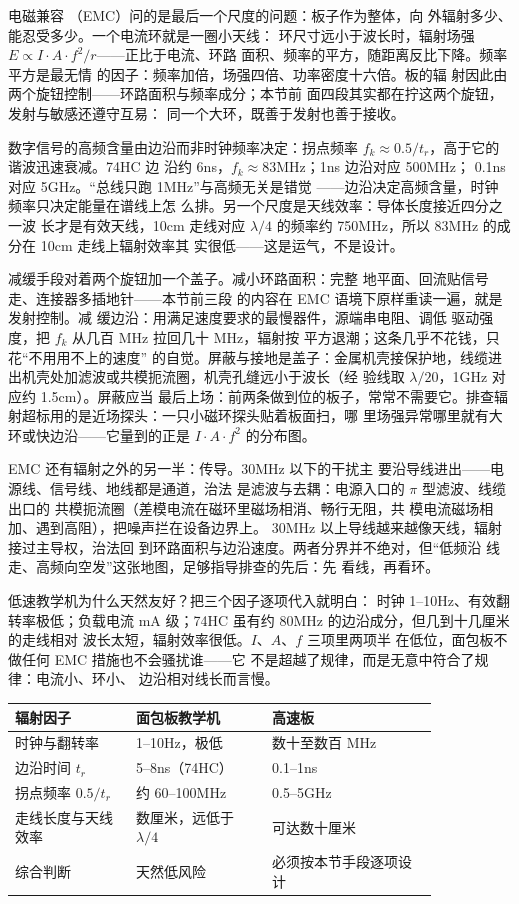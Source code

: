 电磁兼容
（EMC）问的是最后一个尺度的问题：板子作为整体，向
外辐射多少、能忍受多少。一个电流环就是一圈小天线：
环尺寸远小于波长时，辐射场强
$E\propto I\cdot A\cdot f^2/r$——正比于电流、环路
面积、频率的平方，随距离反比下降。频率平方是最无情
的因子：频率加倍，场强四倍、功率密度十六倍。板的辐
射因此由两个旋钮控制——环路面积与频率成分；本节前
面四段其实都在拧这两个旋钮，发射与敏感还遵守互易：
同一个大环，既善于发射也善于接收。

数字信号的高频含量由边沿而非时钟频率决定：拐点频率
$f_k\approx0.5/t_r$，高于它的谐波迅速衰减。74HC 边
沿约 6ns，$f_k\approx83$MHz；1ns 边沿对应 500MHz；
0.1ns 对应 5GHz。“总线只跑 1MHz”与高频无关是错觉
——边沿决定高频含量，时钟频率只决定能量在谱线上怎
么排。另一个尺度是天线效率：导体长度接近四分之一波
长才是有效天线，10cm 走线对应 $\lambda/4$ 的频率约
750MHz，所以 83MHz 的成分在 10cm 走线上辐射效率其
实很低——这是运气，不是设计。

减缓手段对着两个旋钮加一个盖子。减小环路面积：完整
地平面、回流贴信号走、连接器多插地针——本节前三段
的内容在 EMC 语境下原样重读一遍，就是发射控制。减
缓边沿：用满足速度要求的最慢器件，源端串电阻、调低
驱动强度，把 $f_k$ 从几百 MHz 拉回几十 MHz，辐射按
平方退潮；这条几乎不花钱，只花“不用用不上的速度”
的自觉。屏蔽与接地是盖子：金属机壳接保护地，线缆进
出机壳处加滤波或共模扼流圈，机壳孔缝远小于波长（经
验线取 $\lambda/20$，1GHz 对应约 1.5cm）。屏蔽应当
最后上场：前两条做到位的板子，常常不需要它。排查辐
射超标用的是近场探头：一只小磁环探头贴着板面扫，哪
里场强异常哪里就有大环或快边沿——它量到的正是
$I\cdot A\cdot f^2$ 的分布图。

EMC 还有辐射之外的另一半：传导。30MHz 以下的干扰主
要沿导线进出——电源线、信号线、地线都是通道，治法
是滤波与去耦：电源入口的 $\pi$ 型滤波、线缆出口的
共模扼流圈（差模电流在磁环里磁场相消、畅行无阻，共
模电流磁场相加、遇到高阻），把噪声拦在设备边界上。
30MHz 以上导线越来越像天线，辐射接过主导权，治法回
到环路面积与边沿速度。两者分界并不绝对，但“低频沿
线走、高频向空发”这张地图，足够指导排查的先后：先
看线，再看环。

低速教学机为什么天然友好？把三个因子逐项代入就明白：
时钟 1--10Hz、有效翻转率极低；负载电流 mA 级；74HC
虽有约 80MHz 的边沿成分，但几到十几厘米的走线相对
波长太短，辐射效率很低。$I$、$A$、$f$ 三项里两项半
在低位，面包板不做任何 EMC 措施也不会骚扰谁——它
不是超越了规律，而是无意中符合了规律：电流小、环小、
边沿相对线长而言慢。

\begin{longtable}{L{0.24\linewidth}L{0.27\linewidth}L{0.33\linewidth}}
\toprule
辐射因子 & 面包板教学机 & 高速板 \\
\midrule
时钟与翻转率 & 1--10Hz，极低 & 数十至数百 MHz \\\tablerowrule
边沿时间 $t_r$ & 5--8ns（74HC） & 0.1--1ns \\\tablerowrule
拐点频率 $0.5/t_r$ & 约 60--100MHz & 0.5--5GHz \\\tablerowrule
走线长度与天线效率 & 数厘米，远低于 $\lambda/4$ & 可达数十厘米 \\\tablerowrule
综合判断 & 天然低风险 & 必须按本节手段逐项设计 \\
\bottomrule
\end{longtable}

